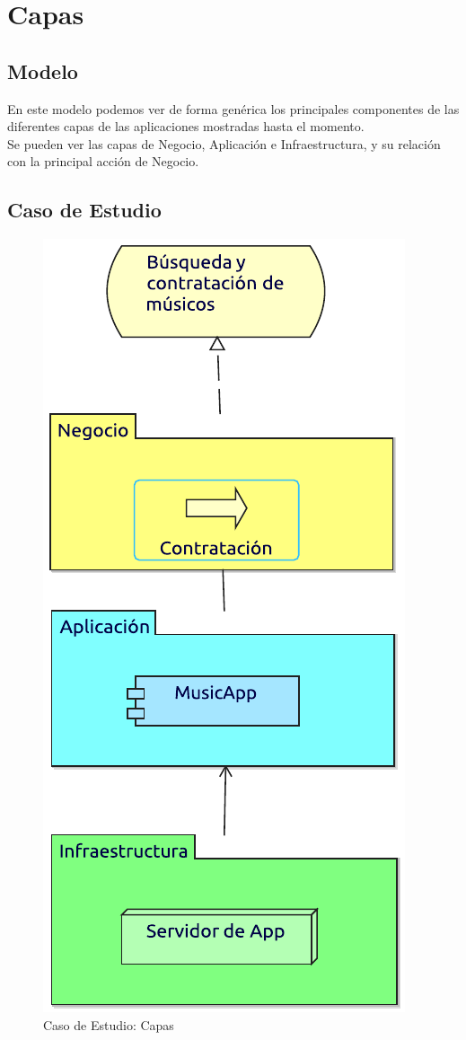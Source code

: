 \newpage

\section{Capas}
\subsection{Modelo}
En este modelo podemos ver de forma genérica los principales componentes de las diferentes capas de las aplicaciones mostradas hasta el momento. \\

Se pueden ver las capas de Negocio, Aplicación e Infraestructura, y su relación con la principal acción de Negocio.
\subsection{Caso de Estudio}

\begin{figure}[hbt!]
	\centering
	\includegraphics[width=0.4\linewidth]{Arquitectura/Tecnologia/imgs/capas.pdf}
	\caption{Caso de Estudio: Capas}
\end{figure}

